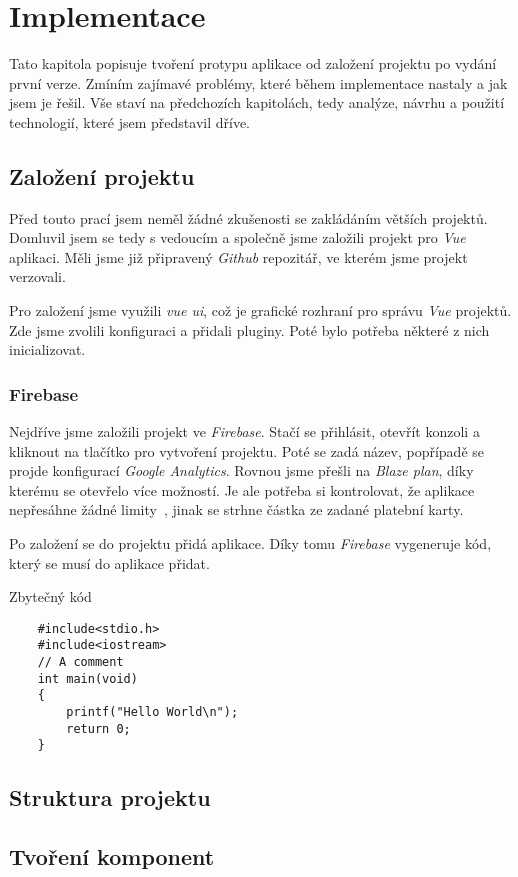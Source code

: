 
\chapter{Implementace}
Tato kapitola popisuje tvoření protypu aplikace od založení projektu po vydání první verze. Zmíním zajímavé problémy,
které během implementace nastaly a jak jsem je řešil. Vše staví na předchozích kapitolách, tedy analýze, návrhu a použití
technologií, které jsem představil dříve.

\section{Založení projektu}
Před touto prací jsem neměl žádné zkušenosti se zakládáním větších projektů. Domluvil jsem se tedy s vedoucím a společně
jsme založili projekt pro \emph{Vue} aplikaci. Měli jsme již připravený \emph{Github} repozitář, ve kterém jsme projekt
verzovali.

Pro založení jsme využili \emph{vue ui}, což je grafické rozhraní pro správu \emph{Vue} projektů. Zde jsme zvolili konfiguraci
a přidali pluginy. Poté bylo potřeba některé z nich inicializovat.

\subsection{Firebase}
Nejdříve jsme založili projekt ve \emph{Firebase}. Stačí se přihlásit, otevřít konzoli a kliknout na tlačítko pro vytvoření projektu.
Poté se zadá název, popřípadě se projde konfigurací \emph{Google Analytics}. Rovnou jsme přešli na \emph{Blaze plan}, díky kterému
se otevřelo více možností. Je ale potřeba si kontrolovat, že aplikace nepřesáhne žádné limity~\cite{FirebaseLimits}, jinak se strhne
částka ze zadané platební karty.

Po založení se do projektu přidá aplikace. Díky tomu \emph{Firebase} vygeneruje kód, který se musí do aplikace přidat.


\begin{listing}
    \caption{Zbytečný kód}\label{list:8-6}
    \begin{verbatim}
    #include<stdio.h>
    #include<iostream>
    // A comment
    int main(void)
    {
        printf("Hello World\n");
        return 0;
    }
    \end{verbatim}
\end{listing}


\section{Struktura projektu}

\section{Tvoření komponent}
